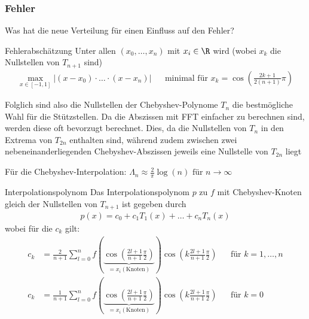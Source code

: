 \newpage
\subsubsection{Fehler}
Was hat die neue Verteilung für einen Einfluss auf den Fehler?

\begin{theorem}[]{Fehlerabschätzung}
	Unter allen $(x_0, \ldots, x_n)$ mit $x_i \in \R$ wird (wobei $x_k$ die Nullstellen von $T_{n + 1}$ sind)
	\rmvspace
	\begin{align*}
		\max_{x \in [-1, 1]} |(x - x_0) \cdot \ldots \cdot (x - x_n)| &  & \text{minimal für } x_k = \cos \left( \frac{2k + 1}{2(n + 1)}\pi \right)
	\end{align*}
\end{theorem}

Folglich sind also die Nullstellen der Chebyshev-Polynome $T_n$ die bestmögliche Wahl für die Stützstellen.
Da die Abszissen mit FFT einfacher zu berechnen sind, werden diese oft bevorzugt berechnet.
Dies, da die Nullstellen von $T_n$ in den Extrema von $T_{2n}$ enthalten sind, während zudem zwischen zwei nebeneinanderliegenden Chebyshev-Abszissen jeweils eine Nullstelle von $T_{2n}$ liegt

 Für die Chebyshev-Interpolation: $\displaystyle \Lambda_n \approx \frac{2}{\pi} \log(n) \text{ für } n \rightarrow \infty$


\begin{theorem}[]{Interpolationspolynom}
	Das Interpolationspolynom $p$ zu $f$ mit Chebyshev-Knoten gleich der Nullstellen von $T_{n + 1}$ ist gegeben durch
	\begin{align*}
		p(x) = c_0 + c_1 T_1(x) + \ldots + c_n T_n(x)
	\end{align*}
	wobei für die $c_k$ gilt:
	\begin{align*}
		c_k                                                      & = \frac{2}{n + 1} \sum_{l = 0}^{n} f\left( \underbrace{\cos \left( \frac{2l + 1}{n + 1} \frac{\pi}{2} \right)}_{= x_i (\text{Knoten})} \right)
		\cos \left( k \frac{2l + 1}{n + 1} \frac{\pi}{2} \right) &                                                                                                                                                & \text{für } k = 1, \ldots, n \\
		c_k                                                      & = \frac{1}{n + 1} \sum_{l = 0}^{n} f\left( \underbrace{\cos \left( \frac{2l + 1}{n + 1} \frac{\pi}{2} \right)}_{= x_i (\text{Knoten})} \right)
		\cos \left( k \frac{2l + 1}{n + 1} \frac{\pi}{2} \right) &                                                                                                                                                & \text{für } k = 0
	\end{align*}
\end{theorem}

